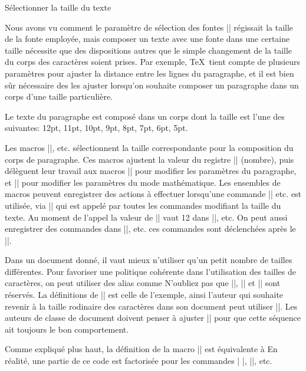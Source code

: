 \formalpar Sélectionner la taille du texte

Nous avons vu comment le paramètre de sélection des fontes |\fontsize|
régissait la taille de la fonte employée, mais composer un texte avec
une fonte dans une certaine taille nécessite que des dispositions
autres que le simple changement de la taille du corps des
caractères soient prises. Par exemple, \TeX\ tient compte de plusieurs
paramètres pour ajuster la distance entre les lignes du paragraphe, et
il est bien sûr nécessaire des les ajuster lorsqu'on souhaite composer
un paragraphe dans un corps d'une taille particulière.

Le texte du paragraphe est composé dans un corps dont la taille est
l'une des suivantes: 12pt, 11pt, 10pt, 9pt, 8pt, 7pt, 6pt, 5pt.

Les macros |\twelvepoint|, etc. sélectionnent la taille correspondante
pour la composition du corps de paragraphe. Ces macros ajustent la
valeur du registre |\textsize| (nombre), puis délèguent leur
travail aux macros |\textsizesetup| pour modifier les paramètres du
paragraphe, et |\mathsizesetup| pour modifier les paramètres du mode
mathématique. Les ensembles de macros peuvent enregistrer des actions
à effectuer lorsqu'une commande |\twelvepoint| etc. est utilisée, via
|\textsizehook| qui est appelé par toutes les commandes modifiant la
taille du texte. Au moment de l'appel la valeur de |\textsize|
vaut 12 dans |\twelvepoint|, etc. On peut aussi enregistrer des
commandes dans |\twelvepointhook|, etc. ces commandes sont déclenchées
après le |\textsizehook|.

Dans un document donné, il vaut mieux n'utiliser qu'un petit nombre
de tailles différentes. Pour favoriser une politique cohérente dans
l'utilisation des tailles de caractères, on peut utiliser des alias
comme
\begincode
\let\mainsize=\tenpoint
\let\normalsize=\tenpoint
\let\footnotesize=\sevenpoint
\endcode
N'oubliez pas que |\textsize|, |\fontsize| et |\mainsize| sont
réservés. La définitions de |\mainsize| est celle de l'exemple, ainsi
l'auteur qui souhaite revenir à la taille rodinaire des caractères
dans son document peut utiliser |\mainsize|. Les auteurs de classe de
document doivent penser à ajuster |\mainsize| pour que cette séquence
ait toujours le bon comportement.

Comme expliqué plus haut, la définition de la macro |\tenpoint| est
équivalente à
\begincode
\def\tenpoint{%
  \textsize=10
  \expandafter\fontsize\expandafter{\the\textsize pt}%
  \runhook\textsizeadjustments
  \runhook\mathsizeadjustments
  \rm\runhook\tenpointhook
}
\endcode
En réalité, une partie de ce code est factorisée pour les commandes
|\tenpoint|, |\ninepoint|, etc.


